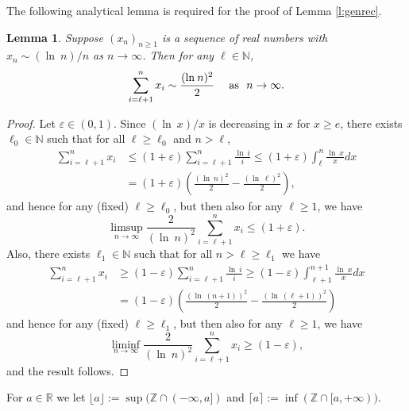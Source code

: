 \documentclass[12pt]{article}
\newcommand{\N}{\mathbb{N}}
\newcommand{\Z}{\mathbb{Z}}
\newcommand{\eps}{\varepsilon}
\newcommand{\R}{\mathbb{R}}
\renewcommand{\log}{{\ln \:}}
\newtheorem{lemm}{Lemma}
\begin{document}
The following analytical lemma is required for the proof of Lemma
	\ref{l:genrec}.

\begin{lemm}
\label{lemsum}
Suppose $(x_n)_{n \geq 1}$ is a sequence of real numbers
with $x_n \sim (\log n)/n$ as $n \to \infty$. Then 
for any $\ell  \in \N$,
$$
\sum_{i=\ell +1}^n x_i \sim \frac{(\log n)^2}{2}  ~~~~ {\rm as} ~~ n \to \infty.
$$
\end{lemm}
\begin{proof}
Let $\eps \in (0,1)$. Since $(\log x)/x$ is decreasing in $x$ for $x \geq e$,
there exists $\ell_0 \in \N$ such
that for all $\ell \geq \ell_0$  and $n > \ell$,
	\begin{align*}
	\sum_{i=\ell+1}^n x_i  & \leq (1+ \eps) \sum_{i=\ell+1}^n \frac{\log i}{i} 
\leq (1+ \eps) \int_{\ell}^n \frac{\log x}{x} dx 
\\
	& = (1+ \eps) \left( \frac{(\log n)^2}{2} -
\frac{(\log \ell)^2}{2} \right),
	\end{align*}
and hence  for any (fixed) $\ell \geq \ell_0$, but then also for 
any $\ell \geq 1$, we have
$$ 
\limsup_{n  \to \infty} \frac{2}{(\log n)^2} \sum_{i= \ell+1}^n x_i 
\leq (1+ \eps).
$$
Also, there exists $\ell_1 \in \N$ such that for all $ n > \ell \geq \ell_1$ 
we have
	\begin{align*}
		\sum_{i=\ell+1}^n x_i &  \geq (1- \eps) \sum_{i=\ell+1}^n \frac{\log i}{i} 
\geq (1- \eps) \int_{\ell+1}^{n+1} \frac{\log x}{x} dx 
\\
		&	=  (1- \eps) \left( \frac{(\log (n+1))^2}{2} - \frac{(\log (\ell+1))^2}{2} \right)
	\end{align*}
and hence  for any (fixed) $\ell \geq \ell_1$, but then also for 
any $\ell \geq 1$, we have
$$ 
\liminf_{n  \to \infty} \frac{2}{(\log n)^2} \sum_{i= \ell+1}^n x_i 
\geq (1- \eps),
$$
and the result follows.
\end{proof}

 For $a \in \R$ we let $\lfloor a \rfloor := \sup(\Z \cap (-\infty,a])$
 and $\lceil a \rceil
 := \inf(\Z \cap [a,+\infty))$.
\end{document}
